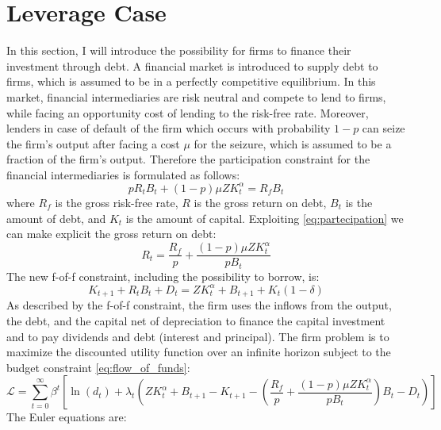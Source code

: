 \documentclass[12pt]{report}
\begin{document}
\section{Leverage Case}
In this section, I will introduce the possibility for firms to finance their investment through debt. A financial market is
introduced to supply debt to firms, which is assumed to be in a perfectly competitive equilibrium. In this market,
financial intermediaries are risk neutral and compete to lend to firms, while facing an opportunity cost of lending to the risk-free rate.
Moreover, lenders in case of default of the firm which occurs with probability \(1-p\) can seize the firm's output after
facing a cost \(\mu\) for the seizure, which is assumed to be a fraction of the firm's output. Therefore the
participation constraint for the financial intermediaries is formulated as follows:
\begin{equation}
    p R_t B_t + (1-p) \mu Z K_t^{\alpha} = R_f B_t \label{eq:participation}
\end{equation}
where \(R_f\) is the  gross risk-free rate, \(R\) is the gross return on debt, \(B_t\) is the amount of debt, and
\(K_t\) is the amount of capital. Exploiting \ref{eq:partecipation} we can make explicit the gross return on debt:
\begin{equation}
    R_t = \frac{R_f}{p} + \frac{(1-p)\mu Z K_t^{\alpha}}{p B_t}
\end{equation}
The new f-of-f constraint, including the possibility to borrow, is:
\begin{equation}
    K_{t+1} + R_t B_{t} + D_{t} = Z K_t^{\alpha} + B_{t+1} + K_{t} (1-\delta) \label{eq:flow_of_funds}
\end{equation}
As described by the f-of-f constraint, the firm uses the inflows from the output, the debt, and the capital net of
depreciation to finance the capital investment and to pay dividends and debt (interest and principal).
The firm problem is to maximize the discounted utility function over an infinite horizon subject to the budget constraint \ref{eq:flow_of_funds}:
\begin{equation}
    \mathcal{L} = \sum_{t=0}^{\infty} \beta^t \left[ \ln(d_t) + \lambda_t \left( Z K_t^{\alpha} + B_{t+1} - K_{t+1} - \left(\frac{R_f}{p} + \frac{(1-p)\mu Z K_t^{\alpha}}{p B_t}\right) B_t - D_t \right) \right]
\end{equation}
The Euler equations are:
\end{document}
